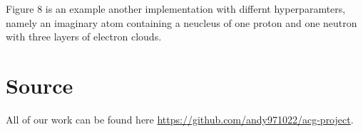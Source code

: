 \documentclass[acmtog]{acmart}
\begin{document}
Figure 8 is an example another implementation with differnt hyperparamters, namely an imaginary atom containing a neucleus of one proton and one neutron with three layers of electron clouds.

\section{Source}
All of our work can be found here \href{https://github.com/andy971022/acg-project}{https://github.com/andy971022/acg-project}.





\end{document}
